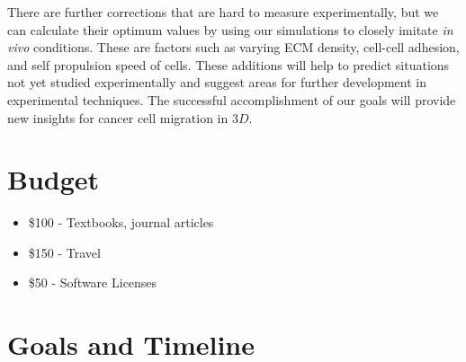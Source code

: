\documentclass[aps,prb,twocolumn,groupedaddress,nofootinbib,floatfix]{revtex4}
\begin{document}
There are further corrections that are hard to measure experimentally, but we can calculate their optimum values by using our simulations to closely imitate {\it in vivo} conditions. 
These are factors such as varying ECM density, cell-cell adhesion, and self propulsion speed of cells.
These additions will help to predict situations not yet studied experimentally and suggest areas for further development in experimental techniques. The successful accomplishment of our goals will provide
new insights for cancer cell migration in $3D$.
\vspace{0.0in}
\section*{Budget}
\begin{itemize}\itemsep1pt \parskip0pt
\item \$100 - Textbooks, journal articles
\item \$150 - Travel
\item \$50 - Software Licenses
\end{itemize}

\section*{Goals and Timeline}
\end{document}
